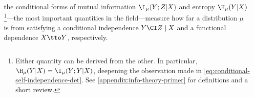 {%
the conditional forms of mutual information $\I_\mu(Y;Z|X)$
and entropy $\H_\mu(Y|X)$%
\footnote{
Either quantity can be derived from the other. 
In particular, $\H_\mu(Y|X) = \I_{\mu}(Y;Y|X)$, deepening 
the observation made in \cref{eq:conditional-self-independence-det}.
See \cref{appendix:info-theory-primer} for definitions and a short review.}---the most important quantities in the field---measure
how far a distribution $\mu$ is from satisfying
a conditional independence $Y \CI Z \mid X$ and
a functional dependence $X \tto Y$,
respectively. 
%
%
}
